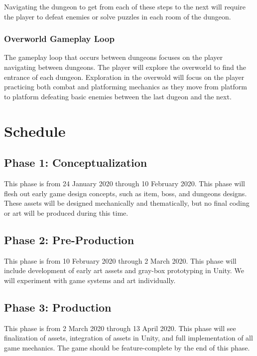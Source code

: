 \documentclass[titlepage]{article}
\begin{document}
Navigating the dungeon to get from each of these steps to the next will require
the player to defeat enemies or solve puzzles in each room of the dungeon.

\subsubsection*{Overworld Gameplay Loop}
The gameplay loop that occurs between dungeons focuses on the player navigating
between dungeons. The player will explore the overworld to find the entrance of
each dungeon. Exploration in the overwold will focus on the player practicing
both combat and platforming mechanics as they move from platform to platform
defeating basic enemies between the last dugeon and the next.

\section{Schedule}

\subsection*{Phase 1: Conceptualization}

This phase is from 24 January 2020 through 10 February 2020. This phase will
flesh out early game design concepts, such as item, boss, and dungeons designs.
These assets will be designed mechanically and thematically, but no final coding
or art will be produced during this time.

\subsection*{Phase 2: Pre-Production}

This phase is from 10 February 2020 through 2 March 2020. This phase will
include development of early art assets and gray-box prototyping in Unity.
We will experiment with game systems and art individually.

\subsection*{Phase 3: Production}

This phase is from 2 March 2020 through 13 April 2020. This phase will see
finalization of assets, integration of assets in Unity, and full implementation
of all game mechanics. The game should be feature-complete by the end of this
phase.
\end{document}
